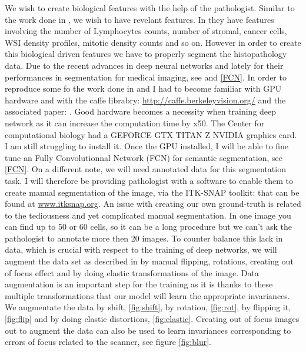 \documentclass[a4paper,10pt]{article}
\begin{document}
We wish to create biological features with the help of the pathologist. Similar to the work done in \cite{yuan2012quantitative}, we wish to have revelant features. In \citep{yuan2012quantitative} they have features involving the number of Lymphocytes counts, number of stromal, cancer cells, WSI density profiles, mitotic density counts and so on. However in order to create this biological driven features we have to properly segment the histopathology data. Due to the recent advances in deep neural networks and lately for their performances in segmentation for medical imaging, see \cite{UNet} and \ref{FCN}. 
In order to reproduce some fo the work done in \cite{UNet} and \cite{FCN} I had to become familiar with GPU hardware and with the caffe librabry: \url{http://caffe.berkeleyvision.org/} and the associated paper: \cite{jia2014caffe}. Good hardware becomes a necessity when training deep network as it can increase the computation time by x50. The Center for computational biology had a GEFORCE GTX TITAN Z NVIDIA graphics card. I am still struggling to install it. 
Once the GPU installed, I will be able to fine tune an Fully Convolutionnal Network (FCN) for semantic segmentation, see \ref{FCN}. On a different note, we will need annotated data for this segmentation task. I will therefore be providing pathologist with a software to enable them to create manual segmentation of the image, via the ITK-SNAP toolkit: \cite{py06nimg} that can be found at \url{www.itksnap.org}. An issue with creating our own ground-truth is related to the tediousness and yet complicated manual segmentation. In one image you can find up to 50 or 60 cells, so it can be a long procedure but we can't ask the pathologist to annotate more then 20 images. To counter balance this lack in data, which is crucial with respect to the training of deep networks, we will augment the data set as described in \cite{UNet} by manual flipping, rotations, creating out of focus effect and by doing elastic transformations of the image. Data augmentation is an important step for the training as it is thanks to these multiple transformations that our model will learn the appropriate invariances. We augmentate the data by shift, \ref{fig:shift}, by rotation, \ref{fig:rot}, by flipping it, \ref{fig:flip} and by doing elastic distortions, \ref{fig:elastic}. Creating out of focus images out to augment the data can also be used to learn invariances corresponding to errors of focus related to the scanner, see figure \ref{fig:blur}.
\end{document}
